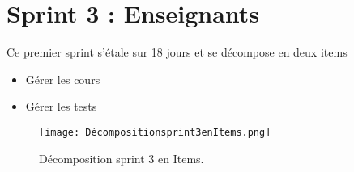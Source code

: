 \clearpage

\section{Sprint 3 : Enseignants }
\label{sec:conception}

\begin{fquote}
	Ce premier sprint s’étale sur 18 jours et se décompose en deux items
\end{fquote}
\smallskip
\begin{itemize}[label=$\diamond$]
	\item Gérer les cours 
	
	\item Gérer les  tests
\end{itemize}
\medskip
\medskip
\medskip
\medskip
\medskip
\medskip
\medskip
\medskip
\medskip
\medskip
\medskip
\begin{figure}[ht]
	\centering
	\texttt{[image: Décompositionsprint3enItems.png]}
	\caption{Décomposition sprint 3 en Items.}
	\label{fig:Décomposition srint 3 en Items}
\end{figure}
\FloatBarrier
\clearpage






